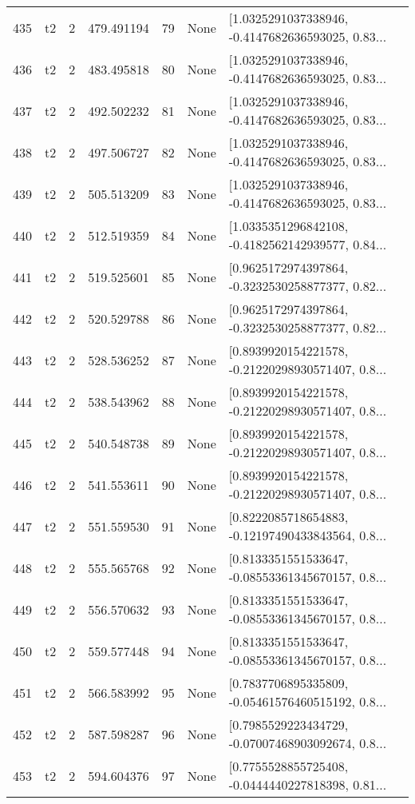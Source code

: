 \begin{tabular}{lllrlll}
435 &  t2 &   2 &   479.491194 &   79 &  None &  [1.0325291037338946, -0.4147682636593025, 0.83... \\
436 &  t2 &   2 &   483.495818 &   80 &  None &  [1.0325291037338946, -0.4147682636593025, 0.83... \\
437 &  t2 &   2 &   492.502232 &   81 &  None &  [1.0325291037338946, -0.4147682636593025, 0.83... \\
438 &  t2 &   2 &   497.506727 &   82 &  None &  [1.0325291037338946, -0.4147682636593025, 0.83... \\
439 &  t2 &   2 &   505.513209 &   83 &  None &  [1.0325291037338946, -0.4147682636593025, 0.83... \\
440 &  t2 &   2 &   512.519359 &   84 &  None &  [1.0335351296842108, -0.4182562142939577, 0.84... \\
441 &  t2 &   2 &   519.525601 &   85 &  None &  [0.9625172974397864, -0.3232530258877377, 0.82... \\
442 &  t2 &   2 &   520.529788 &   86 &  None &  [0.9625172974397864, -0.3232530258877377, 0.82... \\
443 &  t2 &   2 &   528.536252 &   87 &  None &  [0.8939920154221578, -0.21220298930571407, 0.8... \\
444 &  t2 &   2 &   538.543962 &   88 &  None &  [0.8939920154221578, -0.21220298930571407, 0.8... \\
445 &  t2 &   2 &   540.548738 &   89 &  None &  [0.8939920154221578, -0.21220298930571407, 0.8... \\
446 &  t2 &   2 &   541.553611 &   90 &  None &  [0.8939920154221578, -0.21220298930571407, 0.8... \\
447 &  t2 &   2 &   551.559530 &   91 &  None &  [0.8222085718654883, -0.12197490433843564, 0.8... \\
448 &  t2 &   2 &   555.565768 &   92 &  None &  [0.8133351551533647, -0.08553361345670157, 0.8... \\
449 &  t2 &   2 &   556.570632 &   93 &  None &  [0.8133351551533647, -0.08553361345670157, 0.8... \\
450 &  t2 &   2 &   559.577448 &   94 &  None &  [0.8133351551533647, -0.08553361345670157, 0.8... \\
451 &  t2 &   2 &   566.583992 &   95 &  None &  [0.7837706895335809, -0.05461576460515192, 0.8... \\
452 &  t2 &   2 &   587.598287 &   96 &  None &  [0.7985529223434729, -0.07007468903092674, 0.8... \\
453 &  t2 &   2 &   594.604376 &   97 &  None &  [0.7755528855725408, -0.0444440227818398, 0.81... \\

\end{tabular}
